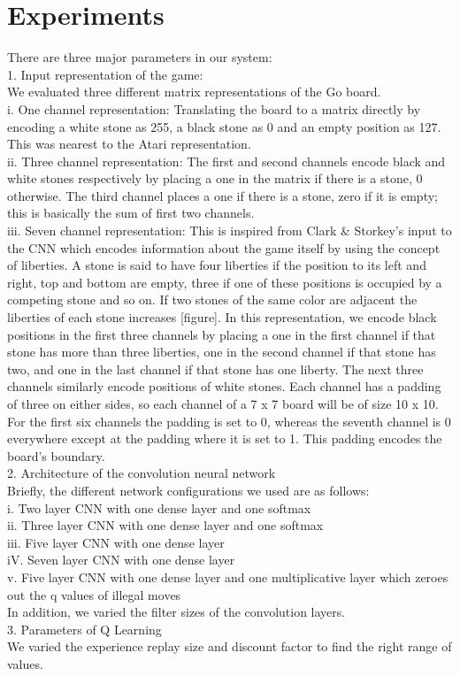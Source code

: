 \section{Experiments}
There are three major parameters in our system:
\\
1. Input representation of the game:
\\
We evaluated three different matrix representations of the Go board.
\\
i. One channel representation: Translating the board to a matrix directly by encoding a white stone as 255, a black stone as 0 and an empty position as 127. This was nearest to the Atari representation.
\\ii. Three channel representation: The first and second channels encode black and white stones respectively by placing a one in the matrix if there is a stone, 0 otherwise. The third channel places a one if there is a stone, zero if it is empty; this is basically the sum of first two channels.
\\
iii. Seven channel representation: This is inspired from Clark \& Storkey's input to the CNN which encodes information about the game itself by using the concept of liberties. A stone is said to have four liberties if the position to its left and right, top and bottom are empty, three if one of these positions is occupied by a competing stone and so on. If two stones of the same color are adjacent the liberties of each stone increases [figure]. In this representation, we encode black positions in the first three channels by placing a one in the first channel if that stone has more than three liberties, one in the second channel if that stone has two, and one in the last channel if that stone has one liberty. The next three channels similarly encode positions of white stones. Each channel has a padding of three on either sides, so each channel of a 7 x 7 board will be of size 10 x 10. For the first six channels the padding is set to 0, whereas the seventh channel is 0 everywhere except at the padding where it is set to 1. This padding encodes the board's boundary.
\\
2. Architecture of the convolution neural network
\\
Briefly, the different network configurations we used are as follows:
\\
i. Two layer CNN with one dense layer and one softmax
\\
ii. Three layer CNN with one dense layer and one softmax
\\
iii. Five layer CNN with one dense layer
\\
iV. Seven layer CNN with one dense layer
\\
v. Five layer CNN with one dense layer and one multiplicative layer which zeroes out the q values of illegal moves
\\
In addition, we varied the filter sizes of the convolution layers.
\\
3. Parameters of Q Learning
\\
We varied the experience replay size and discount factor to find the right range of values. 
\\

